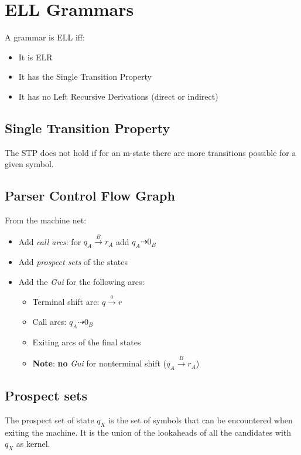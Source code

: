 \section{ELL Grammars}

A grammar is ELL iff:
\begin{itemize}
    \item It is ELR
    \item It has the Single Transition Property
    \item It has no Left Recursive Derivations (direct or indirect)
\end{itemize}

\subsection{Single Transition Property}
The STP does not hold if for an m-state there are more transitions possible for a given symbol.

\subsection{Parser Control Flow Graph}

From the machine net:
\begin{itemize}
    \item Add \emph{call arcs}: for $q_A \xrightarrow{B} r_A$ add $q_A \dashrightarrow 0_B$
    \item Add \emph{prospect sets} of the states
    \item Add the \emph{Gui} for the following arcs:
    \begin{itemize}
        \item Terminal shift arc: $q \xrightarrow{a} r$
        \item Call arcs: $q_A \dashrightarrow 0_B$
        \item Exiting arcs of the final states
        \item \textbf{Note}: \textbf{no} \emph{Gui} for nonterminal shift ($q_A \xrightarrow{B} r_A$)
    \end{itemize}
\end{itemize}

\subsection{Prospect sets}
The prospect set of state $q_X$ is the set of symbols that can be encountered when exiting the machine.
It is the union of the lookaheads of all the candidates with $q_X$ as kernel.

